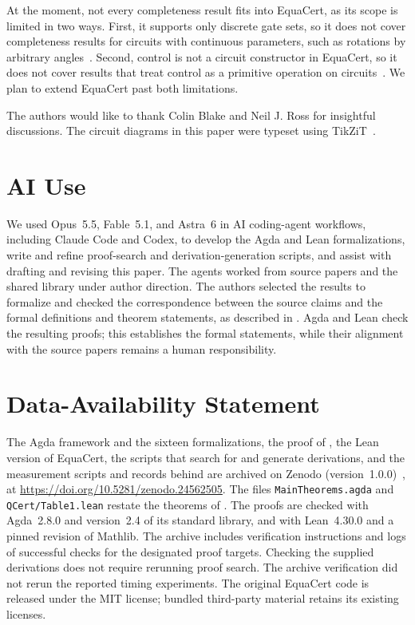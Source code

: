 \documentclass[acmsmall,screen,nonacm]{acmart}
\begin{document}
At the moment, not every completeness result fits into EquaCert, as its scope is limited in two ways. First, it supports only discrete gate sets, so it does not cover completeness results for circuits with continuous parameters, such as rotations by arbitrary angles~\cite{clement2023complete,clement2024extensions,clement2024minimal}. Second, control is not a circuit constructor in EquaCert, so it does not cover results that treat control as a primitive operation on circuits~\cite{delorme2026control,schober2026control,blake2026qudit}. We plan to extend EquaCert past both limitations.
\fi

\begin{acks}
The authors would like to thank Colin Blake and Neil J. Ross for insightful discussions. The circuit diagrams in this paper were typeset using TikZiT~\cite{tikzit}.
\end{acks}

\section*{AI Use}
We used Opus~5.5, Fable~5.1, and Astra~6 in AI coding-agent workflows,
including Claude Code and Codex, to develop the Agda and Lean
formalizations, write and refine proof-search and derivation-generation
scripts, and assist with drafting and revising this paper.
The agents worked from source papers and the shared library under
author direction. The authors selected the results to formalize and
checked the correspondence between the source claims and the formal
definitions and theorem statements, as described in .
Agda and Lean check the resulting proofs; this establishes the formal
statements, while their alignment with the source papers remains a
human responsibility.

\section*{Data-Availability Statement}
The Agda framework and the sixteen formalizations, the proof of , the Lean version of EquaCert, the scripts that search for and generate derivations, and the measurement scripts and records behind  %
are archived on Zenodo (version~1.0.0)~\cite{equacert2026artifact}, at \url{https://doi.org/10.5281/zenodo.24562505}. The files \texttt{MainTheorems.agda} and \texttt{QCert/Table1.lean} restate the theorems of . The proofs are checked with Agda~2.8.0 and version~2.4 of its standard library, and with Lean~4.30.0 and a pinned revision of Mathlib.
The archive includes verification instructions and logs of successful checks for the designated proof targets. Checking the supplied derivations does not require rerunning proof search. The archive verification did not rerun the reported timing experiments.
The original EquaCert code is released under the MIT license; bundled third-party material retains its existing licenses.
\end{document}
